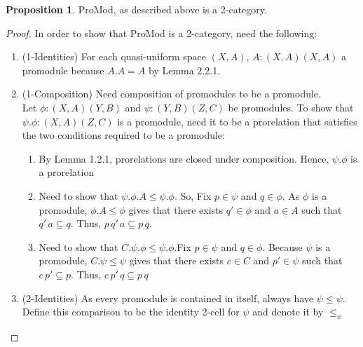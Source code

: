 \documentclass[a4paper]{article}
\makeatletter
\theoremstyle{definition}
\newtheorem{prop}[theorem]{Proposition}
\newcommand{\carrow}{}%
\DeclareRobustCommand{\carrow}{%
	\mathrel{\vphantom{\rightarrow}\mathpalette\circle@arrow\relax}%
}
\newcommand{\circle@arrow}[2]{%
	\m@th
	\ooalign{%
		\hidewidth$#1\circ\mkern1mu$\hidewidth\cr
	$#1\longrightarrow$\cr}%
}
\makeatother
\begin{document}
			\begin{prop}%
				ProMod, as described above is a 2-category.
			\end{prop}
			\begin{proof}\setcounter{equation}{0}
				In order to show that ProMod is a 2-category, need the following:
				\begin{enumerate}[label=(\alph*)]
					\item (1-Identities) For each quasi-uniform space $(X,A)$,
						$A:(X,A) \carrow (X,A)$ a promodule because $A.A=A$ by Lemma 2.2.1.
					\item (1-Composition) Need composition of promodules to be a promodule.\\
						Let $\phi:(X,A)\carrow (Y,B)$ and $\psi:(Y,B)\carrow (Z,C)$ be promodules.
						To show that $\psi.\phi:(X,A) \carrow (Z,C)$ is a promodule, need it to be a
						prorelation that satisfies the two conditions required to be a promodule:
						\begin{enumerate}[label=(\roman*)]
							\item By Lemma 1.2.1, prorelations are closed under composition.
								Hence, $\psi.\phi$ is a prorelation
							\item Need to show that $\psi.\phi.A \leq \psi.\phi$. So, Fix
								$p \in \psi$ and $q \in \phi$. As $\phi$ is a promodule,
								$\phi.A\leq \phi$ gives that there exists
								$ q' \in \phi \text{ and } a\in A$ such that
								$q'\,a \subseteq q$. Thus,
								$p\,q'\,a \subseteq p\,q$.
							\item Need to show that $C.\psi.\phi \leq \psi.\phi$.Fix $p \in \psi$
								and $q\in \phi$. Because
								$\psi$ is a promodule, $C.\psi \leq \psi$ gives that
								there exists $c\in C$ and $p' \in \psi$ such that
								$c\,p' \subseteq p$. Thus, $c\,p'\,q \subseteq p\,q$
						\end{enumerate}
					\item (2-Identities) As every promodule is contained in itself, always have $\psi \leq \psi$.
						Define this comparison to be the identity 2-cell for $\psi$ and denote it by $\leq_\psi$


\end{enumerate}
\end{proof}
\end{document}
